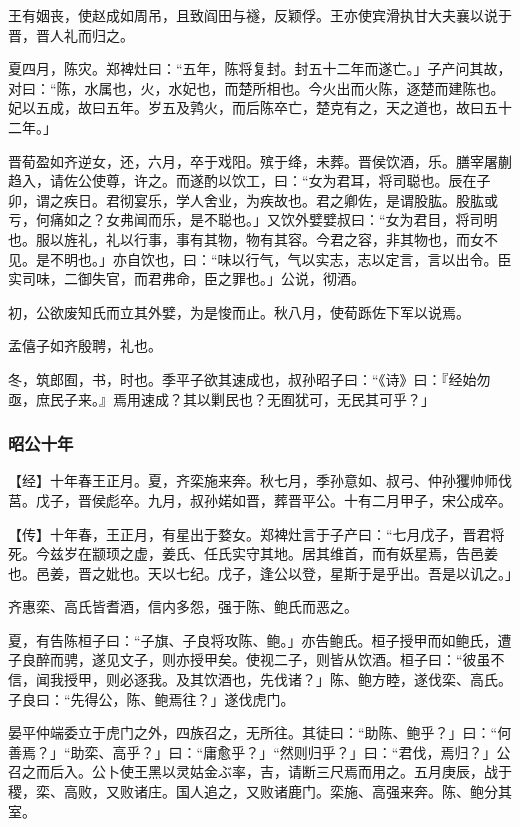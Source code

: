 \documentclass[]{article}
\begin{document}
王有姻丧，使赵成如周吊，且致阎田与襚，反颖俘。王亦使宾滑执甘大夫襄以说于晋，晋人礼而归之。

夏四月，陈灾。郑裨灶曰：``五年，陈将复封。封五十二年而遂亡。」子产问其故，对曰：``陈，水属也，火，水妃也，而楚所相也。今火出而火陈，逐楚而建陈也。妃以五成，故曰五年。岁五及鹑火，而后陈卒亡，楚克有之，天之道也，故曰五十二年。」

晋荀盈如齐逆女，还，六月，卒于戏阳。殡于绛，未葬。晋侯饮酒，乐。膳宰屠蒯趋入，请佐公使尊，许之。而遂酌以饮工，曰：``女为君耳，将司聪也。辰在子卯，谓之疾日。君彻宴乐，学人舍业，为疾故也。君之卿佐，是谓股肱。股肱或亏，何痛如之？女弗闻而乐，是不聪也。」又饮外嬖嬖叔曰：``女为君目，将司明也。服以旌礼，礼以行事，事有其物，物有其容。今君之容，非其物也，而女不见。是不明也。」亦自饮也，曰：``味以行气，气以实志，志以定言，言以出令。臣实司味，二御失官，而君弗命，臣之罪也。」公说，彻酒。

初，公欲废知氏而立其外嬖，为是悛而止。秋八月，使荀跞佐下军以说焉。

孟僖子如齐殷聘，礼也。

冬，筑郎囿，书，时也。季平子欲其速成也，叔孙昭子曰：``《诗》曰：『经始勿亟，庶民子来。』焉用速成？其以剿民也？无囿犹可，无民其可乎？」

\hypertarget{header-n2527}{%
\subsubsection{昭公十年}\label{header-n2527}}

【经】十年春王正月。夏，齐栾施来奔。秋七月，季孙意如、叔弓、仲孙玃帅师伐莒。戊子，晋侯彪卒。九月，叔孙婼如晋，葬晋平公。十有二月甲子，宋公成卒。

【传】十年春，王正月，有星出于婺女。郑裨灶言于子产曰：``七月戊子，晋君将死。今兹岁在颛顼之虚，姜氏、任氏实守其地。居其维首，而有妖星焉，告邑姜也。邑姜，晋之妣也。天以七纪。戊子，逢公以登，星斯于是乎出。吾是以讥之。」

齐惠栾、高氏皆耆酒，信内多怨，强于陈、鲍氏而恶之。

夏，有告陈桓子曰：``子旗、子良将攻陈、鲍。」亦告鲍氏。桓子授甲而如鲍氏，遭子良醉而骋，遂见文子，则亦授甲矣。使视二子，则皆从饮酒。桓子曰：``彼虽不信，闻我授甲，则必逐我。及其饮酒也，先伐诸？」陈、鲍方睦，遂伐栾、高氏。子良曰：``先得公，陈、鲍焉往？」遂伐虎门。

晏平仲端委立于虎门之外，四族召之，无所往。其徒曰：``助陈、鲍乎？」曰：``何善焉？」``助栾、高乎？」曰：``庸愈乎？」``然则归乎？」曰：``君伐，焉归？」公召之而后入。公卜使王黑以灵姑金ぶ率，吉，请断三尺焉而用之。五月庚辰，战于稷，栾、高败，又败诸庄。国人追之，又败诸鹿门。栾施、高强来奔。陈、鲍分其室。
\end{document}
